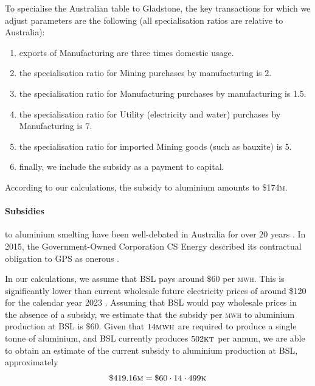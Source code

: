 \documentclass[12pt,a4paper]{article}
\begin{document}
To specialise the Australian table to Gladstone, the key transactions for which
we adjust parameters are the following (all specialisation ratios are relative to
Australia):

\begin{enumerate}
  \item exports of Manufacturing are three times domestic usage.
\item the specialisation ratio for Mining purchases by manufacturing is 2.
\item the specialisation ratio for Manufacturing purchases by manufacturing is
  1.5.
\item the specialisation ratio for Utility (electricity and water) purchases by
  Manufacturing is 7.
\item the specialisation ratio for imported Mining goods (such as bauxite) is
  5.
\item finally, we include the subsidy as a payment to capital.
\end{enumerate}

According to our calculations, the subsidy to aluminium amounts to
\$174\textsc{m}.


\paragraph{Subsidies} to aluminium smelting have been well-debated in Australia
for over 20 years \cite{subsidies}. In 2015, the Government-Owned Corporation
CS Energy  described its contractual obligation to GPS as onerous \cite[page
10]{CSE}.

In our calculations, we assume that BSL pays around $\$60$ per \textsc{mwh}.
This is significantly lower than current wholesale future electricity prices of
around \$120 for the calendar year 2023 \cite{aer}. Assuming that BSL would pay wholesale
prices in the absence of a subsidy, we estimate that the subsidy per
\textsc{mwh} to aluminium production at BSL is $\$60 $.  Given that
$14\textsc{mwh}$ are required to produce a single tonne of aluminium, and BSL
currently produces $502 \textsc{kt}$ per annum, we are able to obtain an estimate of the
current subsidy to aluminium production at BSL, approximately \[\$
419.16\textsc{m} = \$60 \cdot 14 \cdot 499\textsc{k} \] 
\end{document}
